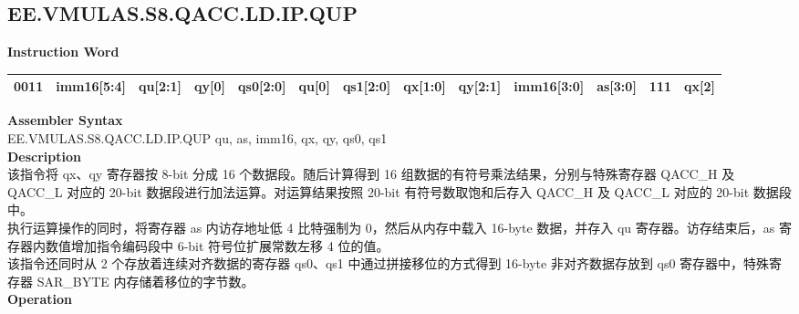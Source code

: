 \clearpage
\subsection{EE.VMULAS.S8.QACC.LD.IP.QUP}\label{instruction:EEVMULASS8QACCLDIPQUP}
\setlength\tabcolsep{5pt}
\textbf{Instruction Word} \\
\begin{tabular}{|c|c|c|c|c|c|c|c|c|c|c|c|c|}
	\hline
	0011 & imm16[5:4] & qu[2:1] & qy[0] & qs0[2:0] & qu[0] & qs1[2:0] & qx[1:0] & qy[2:1] & imm16[3:0] & as[3:0] & 111 & qx[2] \\
	\hline
\end{tabular}

\textbf{Assembler Syntax} \\
EE.VMULAS.S8.QACC.LD.IP.QUP qu, as, imm16, qx, qy, qs0, qs1 \\
\textbf{Description} \\
该指令将 qx、qy 寄存器按 8-bit 分成 16 个数据段。随后计算得到 16 组数据的有符号乘法结果，分别与特殊寄存器 QACC\_H 及 QACC\_L 对应的 20-bit 数据段进行加法运算。对运算结果按照 20-bit 有符号数取饱和后存入 QACC\_H 及 QACC\_L 对应的 20-bit 数据段中。\\
执行运算操作的同时，将寄存器 as 内访存地址低 4 比特强制为 0，然后从内存中载入 16-byte 数据，并存入 qu 寄存器。访存结束后，as 寄存器内数值增加指令编码段中 6-bit 符号位扩展常数左移 4 位的值。\\
该指令还同时从 2 个存放着连续对齐数据的寄存器 qs0、qs1 中通过拼接移位的方式得到 16-byte 非对齐数据存放到 qs0 寄存器中，特殊寄存器 SAR\_BYTE 内存储着移位的字节数。\\
\textbf{Operation}

